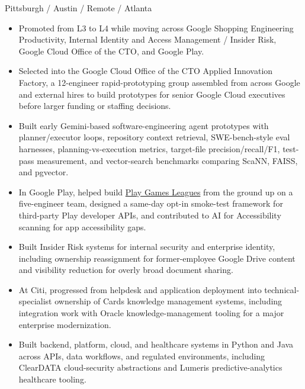 {\small Pittsburgh / Austin / Remote / Atlanta}\par
\begin{itemize}
  \item Promoted from L3 to L4 while moving across Google Shopping Engineering Productivity, Internal Identity and Access Management / Insider Risk, Google Cloud Office of the CTO, and Google Play.
  \item Selected into the Google Cloud Office of the CTO Applied Innovation Factory, a 12-engineer rapid-prototyping group assembled from across Google and external hires to build prototypes for senior Google Cloud executives before larger funding or staffing decisions.
  \item Built early Gemini-based software-engineering agent prototypes with planner/executor loops, repository context retrieval, SWE-bench-style eval harnesses, planning-vs-execution metrics, target-file precision/recall/F1, test-pass measurement, and vector-search benchmarks comparing ScaNN, \mbox{FAISS}, and pgvector.
  \item In Google Play, helped build \href{https://blog.google/products-and-platforms/platforms/google-play/curation-update-september-2025/}{Play Games Leagues} from the ground up on a five-engineer team, designed a same-day opt-in smoke-test framework for third-party Play developer APIs, and contributed to AI for Accessibility scanning for app accessibility gaps.
  \item Built Insider Risk systems for internal security and enterprise identity, including ownership reassignment for former-employee Google Drive content and visibility reduction for overly broad document sharing.
\end{itemize}

\begin{itemize}
  \item At Citi, progressed from helpdesk and application deployment into technical-specialist ownership of Cards knowledge management systems, including integration work with Oracle knowledge-management tooling for a major enterprise modernization.
  \item Built backend, platform, cloud, and healthcare systems in Python and Java across APIs, data workflows, and regulated environments, including ClearDATA cloud-security abstractions and Lumeris predictive-analytics healthcare tooling.
\end{itemize}

